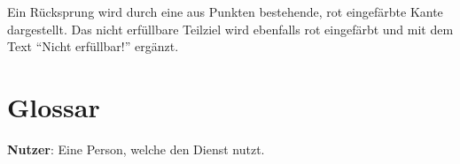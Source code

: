 \documentclass[parskip=full,11pt,twoside]{scrartcl}
\begin{document}
\begin{minipage}{\linewidth}
\end{minipage}

Ein Rücksprung wird durch eine aus Punkten bestehende, rot eingefärbte Kante dargestellt.
Das nicht erfüllbare Teilziel wird ebenfalls rot eingefärbt und mit dem Text \enquote{Nicht erfüllbar!} ergänzt.

\section{Glossar}

\textbf{Nutzer}:
Eine Person, welche den Dienst nutzt.
\end{document}

